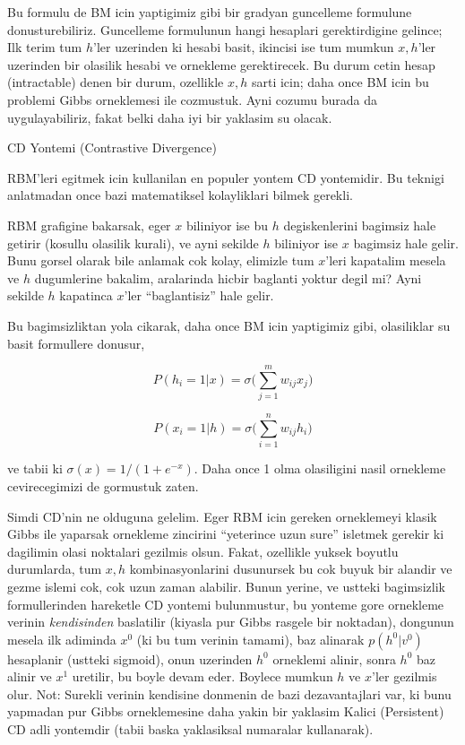 \documentclass[12pt,fleqn]{article}\usepackage{../common}
\begin{document}
Bu formulu de BM icin yaptigimiz gibi bir gradyan guncelleme formulune
donusturebiliriz. Guncelleme formulunun hangi hesaplari gerektirdigine
gelince; Ilk terim tum $h$'ler uzerinden ki hesabi basit, ikincisi ise tum
mumkun $x,h$'ler uzerinden bir olasilik hesabi ve ornekleme
gerektirecek. Bu durum cetin hesap (intractable) denen bir durum, ozellikle
$x,h$ sarti icin; daha once BM icin bu problemi Gibbs orneklemesi ile
cozmustuk. Ayni cozumu burada da uygulayabiliriz, fakat belki daha iyi bir
yaklasim su olacak.

CD Yontemi (Contrastive Divergence) 

RBM'leri egitmek icin kullanilan en populer yontem CD yontemidir. Bu
teknigi anlatmadan once bazi matematiksel kolayliklari bilmek gerekli.

RBM grafigine bakarsak, eger $x$ biliniyor ise bu $h$ degiskenlerini
bagimsiz hale getirir (kosullu olasilik kurali), ve ayni sekilde $h$
biliniyor ise $x$ bagimsiz hale gelir. Bunu gorsel olarak bile anlamak cok
kolay, elimizle tum $x$'leri kapatalim mesela ve $h$ dugumlerine bakalim,
aralarinda hicbir baglanti yoktur degil mi? Ayni sekilde $h$ kapatinca
$x$'ler ``baglantisiz'' hale gelir. 

Bu bagimsizliktan yola cikarak, daha once BM icin yaptigimiz gibi,
olasiliklar su basit formullere donusur,

$$ P(h_i=1|x) = \sigma \bigg( \sum _{j=1}^{m} w_{ij} x_j \bigg) $$

$$ P(x_i=1|h) = \sigma \bigg( \sum _{i=1}^{n} w_{ij} h_i \bigg) $$

ve tabii ki $\sigma(x) = 1 / (1+e^{-x})$. Daha once 1 olma olasiligini
nasil ornekleme cevirecegimizi de gormustuk zaten. 

Simdi CD'nin ne olduguna gelelim. Eger RBM icin gereken orneklemeyi klasik
Gibbs ile yaparsak ornekleme zincirini ``yeterince uzun sure'' isletmek
gerekir ki dagilimin olasi noktalari gezilmis olsun. Fakat, ozellikle
yuksek boyutlu durumlarda, tum $x,h$ kombinasyonlarini dusunursek bu cok
buyuk bir alandir ve gezme islemi cok, cok uzun zaman alabilir. Bunun
yerine, ve ustteki bagimsizlik formullerinden hareketle CD yontemi
bulunmustur, bu yonteme gore ornekleme verinin {\em kendisinden} baslatilir
(kiyasla pur Gibbs rasgele bir noktadan), dongunun mesela ilk adiminda
$x^0$ (ki bu tum verinin tamami), baz alinarak $p(h^0|v^0)$ hesaplanir
(ustteki sigmoid), onun uzerinden $h^0$ orneklemi alinir, sonra $h^0$ baz
alinir ve $x^1$ uretilir, bu boyle devam eder. Boylece mumkun $h$ ve
$x$'ler gezilmis olur. Not: Surekli verinin kendisine donmenin de bazi
dezavantajlari var, ki bunu yapmadan pur Gibbs orneklemesine daha yakin bir
yaklasim Kalici (Persistent) CD adli yontemdir (tabii baska yaklasiksal
numaralar kullanarak).
\end{document}
